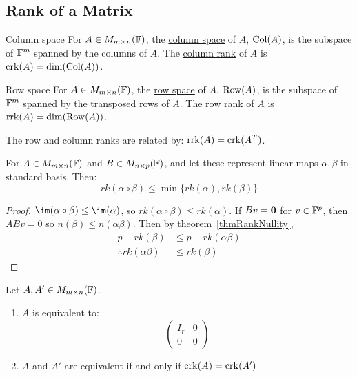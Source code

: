 \documentclass[../Main.tex]{subfiles}
\begin{document}
\subsection{Rank of a Matrix}
\begin{definition}{Column space}
    For $A \in M_{m \times n}(\mathbb{F})$, the \underline{column space} of $A$, $\operatorname{Col}(A)$, is the subspace of $\mathbb{F}^m$ spanned by the columns of $A$. The \underline{column rank} of $A$ is $\operatorname{crk}(A) = \dim(\operatorname{Col}(A))$.
\end{definition}
\begin{definition}{Row space}
    For $A \in M_{m \times n}(\mathbb{F})$, the \underline{row space} of $A$, $\operatorname{Row}(A)$, is the subspace of $\mathbb{F}^m$ spanned by the transposed rows of $A$. The \underline{row rank} of $A$ is $\operatorname{rrk}(A) = \dim(\operatorname{Row}(A))$.
\end{definition}
The row and column ranks are related by: $\operatorname{rrk}(A) = \operatorname{crk}(A^T)$.
\begin{lemma}
    For $A \in M_{m \times n}(\mathbb{F})$ and $B \in M_{n \times p}(\mathbb{F})$, and let these represent linear maps $\alpha, \beta$ in standard basis. Then:
    \begin{equation*}
        rk(\alpha \circ \beta) \leq \min\{rk(\alpha), rk(\beta)\}
    \end{equation*}
    \label{lemRankOfProduct}
\end{lemma}
\begin{proof}
    $\im(\alpha \circ \beta) \leq \im(\alpha)$, so $rk(\alpha \circ \beta) \leq rk(\alpha)$. If $Bv = \boldsymbol{0}$ for $v \in \mathbb{F}^p$, then $ABv = 0$ so $n(\beta) \leq n(\alpha\beta)$. Then by theorem~\ref{thmRankNullity},
    \begin{align*}
        p - rk(\beta) &\leq p - rk(\alpha\beta) \\
        \therefore rk(\alpha\beta) &\leq rk(\beta)
    \end{align*}
\end{proof}
\begin{theorem}
    Let $A, A' \in M_{m \times n}(\mathbb{F})$.
    \begin{enumerate}
        \item $A$ is equivalent to:
        \begin{equation*}
            \begin{pmatrix}
                I_r & 0 \\
                0 & 0
            \end{pmatrix}
        \end{equation*}
        \item $A$ and $A'$ are equivalent if and only if $\operatorname{crk}(A) = \operatorname{crk}(A')$.
    \end{enumerate}
    \label{thmMatEquivClasses}
\end{theorem}
\end{document}
